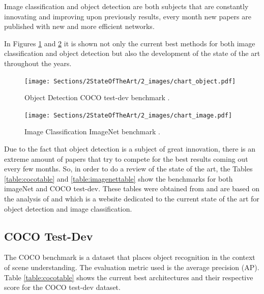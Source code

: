 \par Image classification and object detection are both subjects that are constantly innovating and improving upon previously results, every month new papers are published with new and more efficient networks. 
\par In Figures \ref{fig:leaderboard_object} and \ref{fig:leaderboard_image} it is shown  not only the current best methods for both image classification and object detection but also the development of the state of the art throughout the years.





\begin{figure}[H]
    \centering
    \captionsetup{justification=centering}
    \texttt{[image: Sections/2StateOfTheArt/2\_images/chart\_object.pdf]}
    \caption[Object Detection COCO test-dev benchmark.]{Object Detection COCO test-dev benchmark \cite{papers_object}.}
    \label{fig:leaderboard_object}
\end{figure}

\begin{figure}[H]
    \centering
    \captionsetup{justification=centering}
    \texttt{[image: Sections/2StateOfTheArt/2\_images/chart\_image.pdf]}
    \caption[Image Classification ImageNet benchmark.]{Image Classification ImageNet benchmark \cite{papers_image}.}
    \label{fig:leaderboard_image}
\end{figure}



\par Due to the fact that object detection is a subject of great innovation, there is an extreme amount of papers that try to compete for the best results coming out every few months. So, in order to do a review of the state of the art, the Tables \ref{table:cocotable} and \ref{table:imagenettable} show the benchmarks for both imageNet and COCO test-dev. These tables were obtained from \cite{Ribeiro} and are based on the analysis of \cite{papers_image} and \cite{papers_object} which is a website dedicated to  the current state of the art for object detection and image classification.





\newpage
\subsection{COCO Test-Dev}

\par The COCO benchmark \cite{Lin2014} is a dataset that places object recognition in the context of scene understanding. The evaluation metric used is the average precision (AP). Table \ref{table:cocotable} shows the current best architectures and their respective score for the COCO test-dev dataset.

